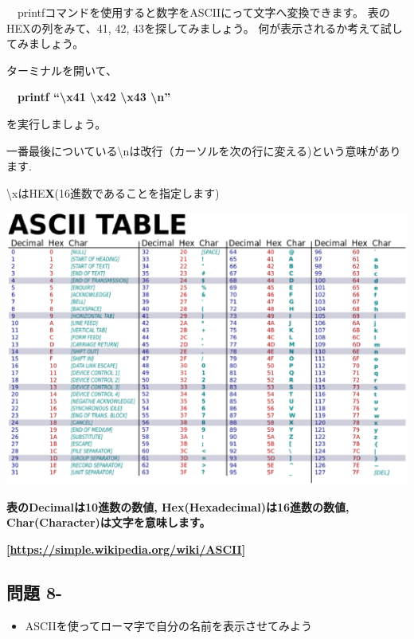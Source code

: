 \documentclass[a4paper,12pt,dvipdfmx]{jarticle}
\newcounter{Question}
\renewcommand\theQuestion{\textbf{問題 8-\arabic{Question}}}
\begin{document}
\ \ printfコマンドを使用すると数字をASCIIにって文字へ変換できます。
表のHEXの列をみて、41,
42,
43を探してみましょう。
何が表示されるか考えて試してみましょう。

ターミナルを開いて、

\ \ \textbf{printf “{\textbackslash}x41 {\textbackslash}x42 {\textbackslash}x43 {\textbackslash}n”}

を実行しましょう。

一番最後についている{\textbackslash}nは改行（カーソルを次の行に変える)という意味があります.

{\textbackslash}xはHE\textbf{X}(16進数であることを指定します)

\begin{center}
\includegraphics[width=17.006cm]{textbook-img016.eps}

\end{center}

\bigskip


\bigskip

{\bfseries
表のDecimalは10進数の数値,
Hex(Hexadecimal)は16進数の数値,
Char(Character)は文字を意味します。}

{\bfseries
[\url{https://simple.wikipedia.org/wiki/ASCII}]}

\clearpage\subsection*{\theQuestion}
\begin{itemize}
\item
ASCIIを使ってローマ字で自分の名前を表示させてみよう
\end{itemize}
\end{document}
